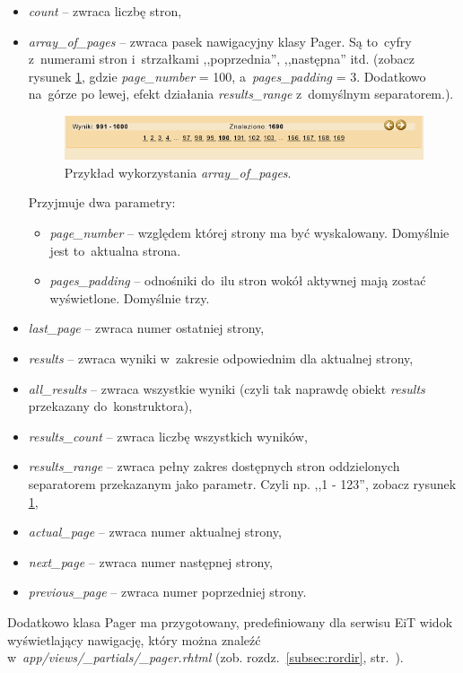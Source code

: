 \documentclass[a4paper,12pt,oneside]{report}
\begin{document}
\begin{itemize}
  \item \emph{count} -- zwraca liczbę stron,
  \item \emph{array\_of\_pages} -- zwraca pasek nawigacyjny klasy Pager. Są to~cyfry z~numerami stron i~strzałkami ,,poprzednia'', ,,następna'' itd. (zobacz rysunek \ref{fig:array_of_pages}, gdzie \emph{page\_number} = 100, a~\emph{pages\_padding} = 3. Dodatkowo na~górze po lewej, efekt działania \emph{results\_range} z~domyślnym separatorem.). 

\begin{figure}[h]
\centering
\includegraphics{array_of_pages.png}
\caption{Przykład wykorzystania \emph{array\_of\_pages}. \label{fig:array_of_pages}}
\end{figure}

Przyjmuje dwa parametry:
  \begin{itemize}
    \item \emph{page\_number} -- względem której strony ma być wyskalowany. Domyślnie jest to~aktualna strona.
    \item \emph{pages\_padding} -- odnośniki do~ilu stron wokół aktywnej mają zostać wyświetlone. Domyślnie trzy.
  \end{itemize}
  \item \emph{last\_page} -- zwraca numer ostatniej strony,
  \item \emph{results} -- zwraca wyniki w~zakresie odpowiednim dla aktualnej strony,
  \item \emph{all\_results} -- zwraca wszystkie wyniki (czyli tak naprawdę obiekt \emph{results} przekazany do~konstruktora),
  \item \emph{results\_count} -- zwraca liczbę wszystkich wyników,
  \item \emph{results\_range} -- zwraca pełny zakres dostępnych stron oddzielonych separatorem przekazanym jako parametr. Czyli np. ,,1 - 123'', zobacz rysunek \ref{fig:array_of_pages},
  \item \emph{actual\_page} -- zwraca numer aktualnej strony,
  \item \emph{next\_page} -- zwraca numer następnej strony,
  \item \emph{previous\_page} -- zwraca numer poprzedniej strony.
\end{itemize}
Dodatkowo klasa Pager ma przygotowany, predefiniowany dla serwisu EiT widok wyświetlający nawigację, który można znaleźć w~\emph{app/views/\_partials/\_pager.rhtml} (zob. rozdz.~\ref{subsec:rordir}, str.~\pageref{subsec:rordir}).
\end{document}
